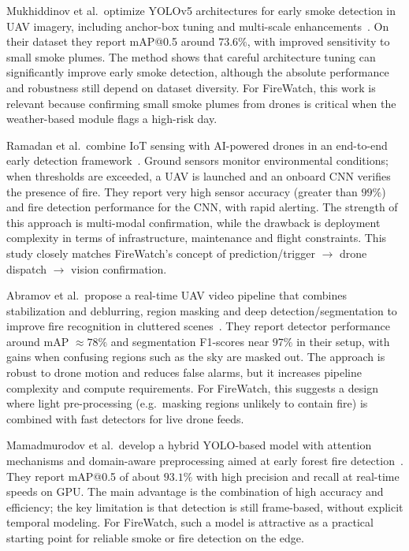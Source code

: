 Mukhiddinov et al.\ optimize YOLOv5 architectures for early smoke detection in UAV imagery, including anchor-box tuning and multi-scale enhancements~\cite{mukhiddinov2022}. On their dataset they report mAP@0.5 around $73.6\%$, with improved sensitivity to small smoke plumes. The method shows that careful architecture tuning can significantly improve early smoke detection, although the absolute performance and robustness still depend on dataset diversity. For FireWatch, this work is relevant because confirming small smoke plumes from drones is critical when the weather-based module flags a high-risk day.

Ramadan et al.\ combine IoT sensing with AI-powered drones in an end-to-end early detection framework~\cite{ramadan2024}. Ground sensors monitor environmental conditions; when thresholds are exceeded, a UAV is launched and an onboard CNN verifies the presence of fire. They report very high sensor accuracy (greater than $99\%$) and fire detection performance for the CNN, with rapid alerting. The strength of this approach is multi-modal confirmation, while the drawback is deployment complexity in terms of infrastructure, maintenance and flight constraints. This study closely matches FireWatch's concept of prediction/trigger $\rightarrow$ drone dispatch $\rightarrow$ vision confirmation.

Abramov et al.\ propose a real-time UAV video pipeline that combines stabilization and deblurring, region masking and deep detection/segmentation to improve fire recognition in cluttered scenes~\cite{abramov2024}. They report detector performance around mAP $\approx 78\%$ and segmentation F1-scores near $97\%$ in their setup, with gains when confusing regions such as the sky are masked out. The approach is robust to drone motion and reduces false alarms, but it increases pipeline complexity and compute requirements. For FireWatch, this suggests a design where light pre-processing (e.g.\ masking regions unlikely to contain fire) is combined with fast detectors for live drone feeds.

Mamadmurodov et al.\ develop a hybrid YOLO-based model with attention mechanisms and domain-aware preprocessing aimed at early forest fire detection~\cite{mamadmurodov2025}. They report mAP@0.5 of about $93.1\%$ with high precision and recall at real-time speeds on GPU. The main advantage is the combination of high accuracy and efficiency; the key limitation is that detection is still frame-based, without explicit temporal modeling. For FireWatch, such a model is attractive as a practical starting point for reliable smoke or fire detection on the edge.

